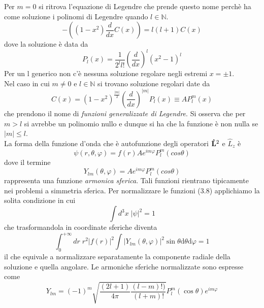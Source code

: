 Per $m=0$ si ritrova l'equazione di Legendre che prende questo nome perch\`e ha come soluzione i polinomi di Legendre quando $l \in \mathbb{N}$.
\begin{equation*}
	- \left ( (1-x^2)\frac{d}{dx}C(x) \right) = l(l+1)C(x)
\end{equation*}
dove la soluzione \`e data da 
\begin{equation}
	P_{l}(x) = \frac{1}{2^l l!}\left (\frac{d}{dx}\right)^l(x^2-1)^l
\end{equation}
Per un l generico non c'\`e nessuna soluzione regolare negli estremi $x = \pm 1$.
\\
Nel caso in cui $m \neq 0$ e $l \in \mathbb{N}$ si trovano soluzione regolari date da 
\begin{equation}
	C(x) = (1-x^2)^{\frac{|m|}{2}}\left ( \frac{d}{dx}\right)^{|m|}P_l(x) \equiv AP_l^m(x)
\end{equation} 
che prendono il nome di \textit{funzioni generalizzate di Legendre}. Si osserva che per $m > l$ si avrebbe un polinomio nullo e dunque si ha che la funzione \`e non nulla se $|m| \leq l$.
\\
La forma della funzione d'onda che \`e autofunzione degli operatori $\bold{\hat{L}}^2$ e $\hat{L}_z$ \`e 
\begin{equation}
	\psi(r,\theta,\varphi) = f(r)Ae^{im\varphi}P_l^m(cos\theta)
\end{equation}
dove il termine 
\begin{equation}
	Y_{lm}(\theta,\varphi) = Ae^{im\varphi}P_l^m(cos\theta)
\end{equation}
rappresenta una funzione \textit{armonica sferica}. Tali funzioni rientrano tipicamente nei problemi a simmetria sferica.
Per normalizzare le funzioni (3.8) applichiamo la solita condizione in cui
\begin{equation*}
	\int d^3x\;|\psi|^2 =1 
\end{equation*} 
che trasformandola in coordinate sferiche diventa
\begin{equation*}
	\int_{0}^{+\infty}dr \; r^2|f(r)|^2 \int |Y_{lm}(\theta,\varphi)|^2 \sin \theta \text{d}\theta \text{d}\varphi  =1
\end{equation*}
il che equivale a normalizzare separatamente la componente radiale della soluzione e quella angolare.
Le armoniche sferiche normalizzate sono espresse come
\begin{equation}
	Y_{lm} = (-1)^{m} \sqrt{\frac{(2l+1)}{4 \pi} \frac{(l-m)!)}{(l+m)!}}P^m_l(\cos \theta)e^{im\varphi}
\end{equation}
